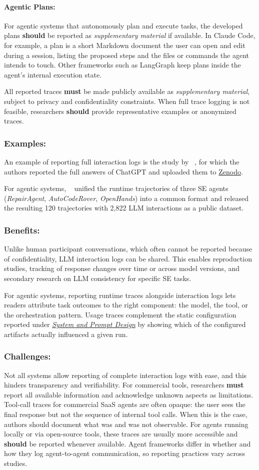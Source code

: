 \documentclass[smallextended]{svjour3}
\newcommand{\must}{\textbf{must}\xspace}
\newcommand{\should}{\textbf{should}\xspace}
\newcommand{\supplementarymaterial}{\emph{supplementary material}\xspace}
\newcommand{\supplementarymaterial}{\emph{supplementary material}\xspace}
\newcommand{\design}{\hyperref[sec:report-system-and-prompt-design]{\emph{System and Prompt Design}}\xspace}
\newcommand{\design}{\href{/guidelines\#report-system-and-prompt-design}{\emph{System and Prompt Design}}\xspace}
\newcommand{\guidelinesubsubsection}[1]{\subsubsection{\bfseries #1:}}
\newcommand{\guidelinesubsubsection}[1]{\subsubsection{#1}}
\begin{document}
\paragraph{Agentic Plans:}
For agentic systems that autonomously plan and execute tasks, the developed plans \should be reported as \supplementarymaterial if available.
In Claude Code, for example, a plan is a short Markdown document the user can open and edit during a session, listing the proposed steps and the files or commands the agent intends to touch.
Other frameworks such as LangGraph keep plans inside the agent's internal execution state.

All reported traces \must be made publicly available as \supplementarymaterial, subject to privacy and confidentiality constraints. When full trace logging is not feasible, researchers \should provide representative examples or anonymized traces.

\guidelinesubsubsection{Examples}

An example of reporting full interaction logs is the study by \citeauthor{ronanki2023investigating}~\cite{ronanki2023investigating}, for which the authors reported the full answers of ChatGPT and uploaded them to \href{https://zenodo.org/records/8124936}{Zenodo}.

For agentic systems, \citeauthor{DBLP:conf/kbse/BouzeniaP25}~\cite{DBLP:conf/kbse/BouzeniaP25} unified the runtime trajectories of three SE agents (\emph{RepairAgent}, \emph{AutoCodeRover}, \emph{OpenHands}) into a common format and released the resulting 120 trajectories with 2,822 LLM interactions as a public dataset.

\guidelinesubsubsection{Benefits}

Unlike human participant conversations, which often cannot be reported because of confidentiality, LLM interaction logs can be shared.
This enables reproduction studies, tracking of response changes over time or across model versions, and secondary research on LLM consistency for specific SE tasks.

For agentic systems, reporting runtime traces alongside interaction logs lets readers attribute task outcomes to the right component: the model, the tool, or the orchestration pattern.
Usage traces complement the static configuration reported under \design by showing which of the configured artifacts actually influenced a given run.

\guidelinesubsubsection{Challenges}

Not all systems allow reporting of complete interaction logs with ease, and this hinders transparency and verifiability.
For commercial tools, researchers \must report all available information and acknowledge unknown aspects as limitations.
Tool-call traces for commercial SaaS agents are often opaque: the user sees the final response but not the sequence of internal tool calls.
When this is the case, authors should document what was and was not observable.
For agents running locally or via open-source tools, these traces are usually more accessible and \should be reported whenever available.
Agent frameworks differ in whether and how they log agent-to-agent communication, so reporting practices vary across studies.
\end{document}
